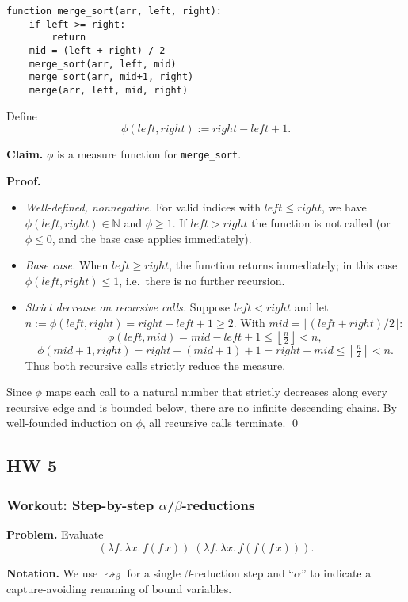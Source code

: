 \documentclass{article}
\theoremstyle{theorem}
\theoremstyle{definition}
\theoremstyle{remark}
\begin{document}
\begin{verbatim}
function merge_sort(arr, left, right):
    if left >= right:
        return
    mid = (left + right) / 2
    merge_sort(arr, left, mid)
    merge_sort(arr, mid+1, right)
    merge(arr, left, mid, right)
\end{verbatim}

Define
\[
\phi(left,right) := right - left + 1.
\]

\textbf{Claim.} $\phi$ is a measure function for \texttt{merge\_sort}.

\textbf{Proof.}
\begin{itemize}
    \item \emph{Well-defined, nonnegative.} For valid indices with $left \leq right$, we have $\phi(left,right) \in \mathbb{N}$ and $\phi \geq 1$. If $left > right$ the function is not called (or $\phi \leq 0$, and the base case applies immediately).
    \item \emph{Base case.} When $left \geq right$, the function returns immediately; in this case $\phi(left,right) \leq 1$, i.e.\ there is no further recursion.
    \item \emph{Strict decrease on recursive calls.} Suppose $left < right$ and let $n := \phi(left,right) = right-left+1 \geq 2$. With $mid = \lfloor (left+right)/2 \rfloor$:
    \[
    \phi(left,mid) = mid - left + 1 \leq \left\lfloor \tfrac{n}{2} \right\rfloor < n,
    \]
    \[
    \phi(mid+1,right) = right - (mid+1) + 1 = right - mid \leq \left\lceil \tfrac{n}{2} \right\rceil < n.
    \]
    Thus both recursive calls strictly reduce the measure.
\end{itemize}

Since $\phi$ maps each call to a natural number that strictly decreases along every recursive edge and is bounded below, there are no infinite descending chains. By well-founded induction on $\phi$, all recursive calls terminate. \qed

\subsection{HW 5}
\subsubsection*{Workout: Step-by-step $\alpha$/$\beta$-reductions}

\noindent\textbf{Problem.} Evaluate
\[
(\lambda f.\,\lambda x.\,f(f\,x))\;(\lambda f.\,\lambda x.\,f(f(f\,x))).
\]

\noindent\textbf{Notation.}
We use $\rightsquigarrow_\beta$ for a single $\beta$-reduction step and “$\alpha$” to indicate a capture-avoiding renaming of bound variables.
\end{document}
